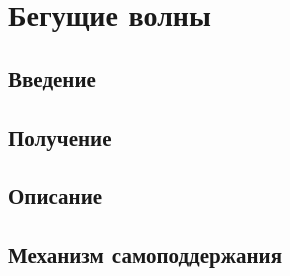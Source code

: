 

\chapter{Бегущие волны}
\section{Введение}
\section{Получение}
\section{Описание}
\section{Механизм самоподдержания}
